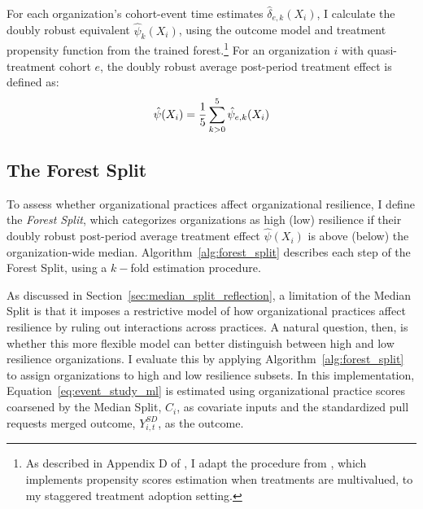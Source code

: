 \documentclass[12pt,notitlepage]{article}
\begin{document}
For each organization's cohort-event time estimates $\hat{\delta}_{e,k}(X_i)$, I calculate the doubly robust equivalent $\hat{\psi}_{k}(X_i)$, using the outcome model and treatment propensity function from the trained forest.\footnote{As described in Appendix D of \cite{liao_generalized_2025}, I adapt the procedure from \cite{uysal_dr_2015}, which implements propensity scores estimation when treatments are multivalued, to my staggered treatment adoption setting.}
For an organization $i$ with quasi-treatment cohort $e$, the doubly robust average post-period treatment effect is defined as:
\begin{equation}\label{eq:doubly_robust}
    \hat{\psi}(X_i) = \frac{1}{5} \sum_{k >0}^{5} \hat{\psi}_{e, k}(X_i)
\end{equation}
\subsection{The Forest Split}\label{sec:forest_splits}

To assess whether organizational practices affect organizational resilience, I define the \textit{Forest Split}, which categorizes organizations as high (low) resilience if their doubly robust post-period average treatment effect $\hat{\psi}(X_i)$ is above (below) the organization-wide median.
Algorithm~\ref{alg:forest_split} describes each step of the Forest Split, using a $k-$fold estimation procedure.



As discussed in Section~\ref{sec:median_split_reflection}, a limitation of the Median Split is that it imposes a restrictive model of how organizational practices affect resilience by ruling out interactions across practices. 
A natural question, then, is whether this more flexible model can better distinguish between high and low resilience organizations.
I evaluate this by applying Algorithm~\ref{alg:forest_split} to assign organizations to high and low resilience subsets.
In this implementation, Equation~\ref{eq:event_study_ml} is estimated using organizational practice scores coarsened by the Median Split, $C_i$, as covariate inputs and the standardized pull requests merged outcome, $Y_{i,t}^{SD}$, as the outcome.
\end{document}

